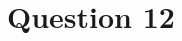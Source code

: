 \documentclass[11pt,notitlepage]{article}\usepackage[]{graphicx}\usepackage[]{color}
\makeatletter
\newenvironment{kframe}{%
 \def\at@end@of@kframe{}%
 \ifinner\ifhmode%
  \def\at@end@of@kframe{\end{minipage}}%
  \begin{minipage}{\columnwidth}%
 \fi\fi%
 \def\FrameCommand##1{\hskip\@totalleftmargin \hskip-\fboxsep
 \colorbox{shadecolor}{##1}\hskip-\fboxsep
     \hskip-\linewidth \hskip-\@totalleftmargin \hskip\columnwidth}%
 \MakeFramed {\advance\hsize-\width
   \@totalleftmargin\z@ \linewidth\hsize
   \@setminipage}}%
 {\par\unskip\endMakeFramed%
 \at@end@of@kframe}
\newenvironment{knitrout}{}{} %
\makeatother
\begin{document}
\section*{Question 12}
\begin{knitrout}
\color{fgcolor}\begin{kframe}
\begin{verbatim}






\end{verbatim}
\end{kframe}
\end{knitrout}
\end{document}
